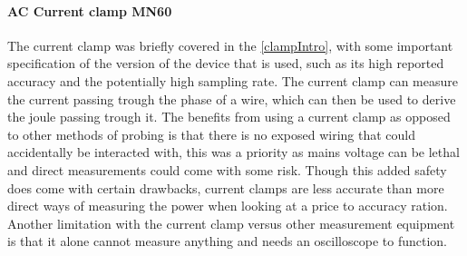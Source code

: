 \paragraph*{AC Current clamp MN60}
The current clamp was briefly covered in the \cref{clampIntro}, with some important specification of the version of the device that is used, such as its high reported accuracy and the potentially high sampling rate. 
The current clamp can measure the current passing trough the phase of a wire, which can then be used to derive the joule passing trough it. The benefits from using a current clamp as opposed to other methods of probing is that there is no exposed wiring that could accidentally be interacted with, this was a priority as mains voltage can be lethal and direct measurements could come with some risk. Though this added safety does come with certain drawbacks, current clamps are less accurate than more direct ways of measuring the power when looking at a price to accuracy ration. Another limitation with the current clamp versus other measurement equipment is that it alone cannot measure anything and needs an oscilloscope to function.